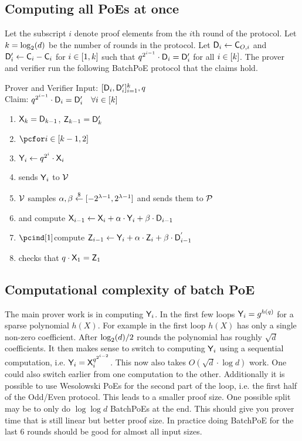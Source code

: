 \documentclass[12pt]{article}
\theoremstyle{Definition}
\begin{document}
\subsection{Computing all PoEs at once}
Let the subscript $i$ denote proof elements from the $i$th round of the protocol. Let $k=\log_2(d)$ be the number of rounds in the protocol.
Let $\mathsf{D}_{i}\gets \mathsf{C}_{O,i}$ and $\mathsf{D}_{i}'\gets \mathsf{C}_{i}-\mathsf{C}_{i}$ for $i \in [1,k]$ such that $q^{2^{i-1}} \cdot \mathsf{D}_i=\mathsf{D}'_i$ for all $i\in [k]$. The prover and verifier run the following \textsf{BatchPoE} protocol that the claims hold.
\begin{mdframed}
Prover and Verifier Input: $[\mathsf{D}_i,\mathsf{D}_i']_{i=1}^{k},q$\\
Claim: $q^{2^{i-1}}\cdot \mathsf{D}_i=\mathsf{D}'_i \quad \forall i \in [k]$
	\begin{enumerate}[nolistsep]
\item $\mathsf{X}_{k}=\mathsf{D}_{k-1}$, $\mathsf{Z}_{k-1}=\mathsf{D}'_{k}$
	\item $\pcfor i \in [\numrounds-1,2]$
   \item \pcind[1]$\mathsf{Y}_{i}\gets q^{2^{i}}\cdot \mathsf{X}_{i}$ 
\item\pcind[1]\prover sends $\mathsf{Y}_{i}$ to $\mathcal{V}$
	\item \pcind[1]$\mathcal{V}$ samples $\alpha,\beta \overset{\$}{\gets} [-2^{\lambda-1} ,2^{\lambda-1}]$ and sends them to $\mathcal{P}$
	\item \pcind[1]\prover and \verifier compute  $\mathsf{X}_{i-1}\gets  \mathsf{X}_{i}+ \alpha\cdot  \mathsf{Y}_{i}+\beta \cdot\mathsf{D}_{i-1}$
	\item $\pcind[1]$\verifier compute   $\mathsf{Z}_{i-1}\gets \mathsf{Y}_{i}+\alpha\cdot \mathsf{Z}_{i}+\beta\cdot \mathsf{D}_{i-1}^{'}$
\item \verifier checks that $q\cdot \mathsf{X}_1=\mathsf{Z}_1$
\end{enumerate}
\end{mdframed}

\subsection{Computational complexity of batch PoE}
The main prover work is in computing $\mathsf{Y}_i$. In the first few loops $\mathsf{Y}_i=g^{h(q)}$ for a sparse polynomial $h(X)$. For example in the first loop $h(X)$ has only a single non-zero coefficient.
After $\log_2(d)/2$ rounds the polynomial has roughly $\sqrt{d}$ coefficients. It then makes sense to switch to computing $\mathsf{Y}_i$ using a sequential computation, i.e. $\mathsf{Y}_i=\mathsf{X}_i^{q^{2^{i-2}}}$. This now also takes $O(\sqrt{d}\cdot \log{d})$ work. One could also switch earlier from one computation to the other. Additionally it is possible to use Wesolowski PoEs for the second part of the loop, i.e. the first half of the Odd/Even protocol. This leads to a smaller proof size. One possible split may be to only do $\log{\log{d}}$ BatchPoEs at the end. This should give you prover time that is still linear but better proof size. In practice doing BatchPoE for the last $6$ rounds should be good for almost all input sizes.
\end{document}
